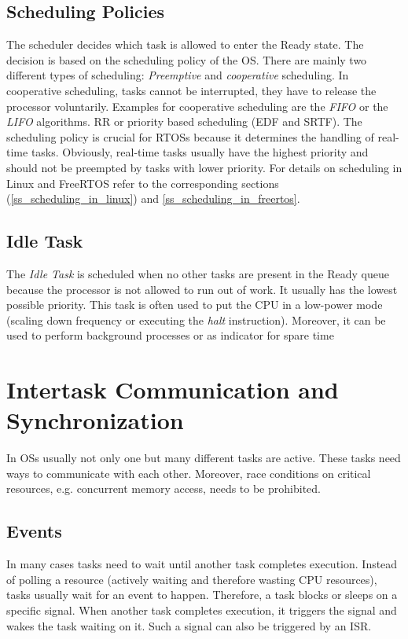 \subsection{Scheduling Policies}\label{ss_scheduling_policy} 
The scheduler decides which task is allowed to enter the Ready state. 
The decision is based on the scheduling policy of the \ac{OS}.
There are mainly two different types of scheduling: \textit{Preemptive} and \textit{cooperative} scheduling.
In cooperative scheduling, tasks cannot be interrupted, they have to release the processor voluntarily. 
Examples for cooperative scheduling are the \textit{\ac{FIFO}} or the \textit{\ac{LIFO}} algorithms.
\ac{RR} or priority based scheduling (\ac{EDF} and \ac{SRTF}).
The scheduling policy is crucial for \acp{RTOS} because it determines the handling of real-time tasks.
Obviously, real-time tasks usually have the highest priority and should not be preempted by tasks with lower priority.
For details on scheduling in Linux and FreeRTOS refer to the corresponding sections (\ref{ss_scheduling_in_linux}) and \ref{ss_scheduling_in_freertos}.

\subsection{Idle Task}
The \textit{Idle Task} is scheduled when no other tasks are present in the Ready queue because the processor is not allowed to run out of work.
It usually has the lowest possible priority.
This task is often used to put the \ac{CPU} in a low-power mode (scaling down frequency or executing the \textit{halt} instruction). 
Moreover, it can be used to perform background processes or as indicator for spare time  
 
\section{Intertask Communication and Synchronization}\label{s_intertask_communication}
In \acp{OS} usually not only one but many different tasks are active.
These tasks need ways to communicate with each other.
Moreover, race conditions on critical resources, e.g. concurrent memory access, needs to be prohibited.

\subsection{Events}
In many cases tasks need to wait until another task completes execution.
Instead of polling a resource (actively waiting and therefore wasting \ac{CPU} resources), tasks usually wait for an event to happen.
Therefore, a task blocks or sleeps on a specific signal.
When another task completes execution, it triggers the signal and wakes the task waiting on it.
Such a signal can also be triggered by an \ac{ISR}.

